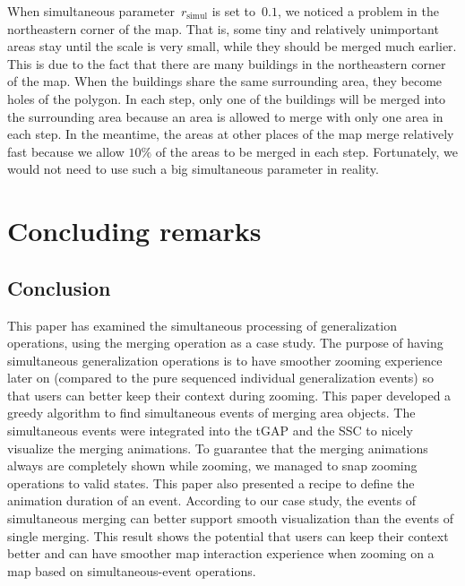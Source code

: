 \documentclass[twocolumn]{svjour3}          %
\begin{document}
When simultaneous parameter~$r_\mathrm{simul}$ is set to~$0.1$,
we noticed a problem in the northeastern corner of the map.
That is, some tiny and relatively unimportant areas stay 
until the scale is very small,
while they should be merged much earlier.
This is due to the fact that 
there are many buildings in the northeastern corner of the map.
When the buildings share the same surrounding area,
they become holes of the polygon.
In each step, only one of the buildings will be merged into the surrounding area
because an area is allowed to merge with only one area in each step.
In the meantime, the areas at other places of the map merge relatively fast
because we allow $10\%$ of the areas to be merged in each step.
Fortunately, we would not need to use such a big simultaneous parameter in reality.





\section{Concluding remarks}
\label{sec:concluding_remarks}

\subsection{Conclusion}
This paper has examined the simultaneous processing 
of generalization operations,
using the merging operation as a case study. 
The purpose of having simultaneous generalization operations 
is to have smoother zooming experience later on 
(compared to the pure sequenced individual generalization events)
so that users can better keep their context during zooming.
This paper developed a greedy algorithm to find simultaneous events of 
merging area objects.
The simultaneous events were integrated into 
the tGAP and the SSC to nicely visualize the merging animations.
To guarantee that the merging animations always are completely shown while zooming, 
we managed to snap zooming operations to valid states.
This paper also presented a recipe 
to define the animation duration of an event.
According to our case study,
the events of simultaneous merging 
can better support smooth visualization than the events of single merging.
This result shows the potential that
users can keep their context better 
and can have smoother map interaction experience
when zooming on a map based on simultaneous-event operations.
\end{document}
